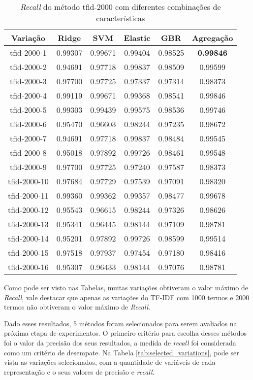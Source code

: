 \begin{table}[H]
\centering
\begin{tabular}{|c| c c  c  c  c| }
\hline
Variação &  Ridge & SVM & Elastic & GBR & Agregação  \\ 
\hline
tfid-2000-1 & 0.99307 & 0.99671 & 0.99404 & 0.98525 & \textbf{0.99846} \\
\hline
tfid-2000-2 & 0.94691 & 0.97718 & 0.99837 & 0.98509 & 0.99599 \\
\hline
tfid-2000-3 & 0.97700 & 0.97725 & 0.97337 & 0.97314 & 0.98373 \\
\hline
tfid-2000-4 & 0.99119 & 0.99671 & 0.99368 & 0.98541 & 0.99846 \\
\hline
tfid-2000-5 & 0.99303 & 0.99439 & 0.99575 & 0.98536 & 0.99746 \\
\hline
tfid-2000-6 & 0.95470 & 0.96603 & 0.98244 & 0.97235 & 0.98672 \\
\hline
tfid-2000-7 & 0.94691 & 0.97718 & 0.99837 & 0.98484 & 0.99545 \\
\hline
tfid-2000-8 & 0.95018 & 0.97892 & 0.99726 & 0.98461 & 0.99548 \\
\hline
tfid-2000-9 & 0.97700 & 0.97725 & 0.97240 & 0.97587 & 0.98373 \\
\hline
tfid-2000-10 & 0.97684 & 0.97729 & 0.97539 & 0.97091 & 0.98320 \\
\hline
tfid-2000-11 & 0.99360 & 0.99362 & 0.99357 & 0.98477 & 0.99678 \\
\hline
tfid-2000-12 & 0.95543 & 0.96615 & 0.98244 & 0.97326 & 0.98626 \\
\hline
tfid-2000-13 & 0.95341 & 0.96445 & 0.98144 & 0.97109 & 0.98781 \\
\hline
tfid-2000-14 & 0.95201 & 0.97892 & 0.99726 & 0.98599 & 0.99514 \\
\hline
tfid-2000-15 & 0.97518 & 0.97937 & 0.97454 & 0.97180 & 0.98416 \\
\hline
tfid-2000-16 & 0.95307 & 0.96433 & 0.98144 & 0.97076 & 0.98781 \\
\hline
\end{tabular}
\caption{\textit{Recall} do método tfid-2000 com diferentes combinações de características}
\label{tab:recalltfid2000}
\end{table}
Como pode ser visto nas Tabelas, muitas variações obtiveram o valor máximo de \textit{Recall}, vale destacar que apenas as variações do TF-IDF com 1000 termos e 2000 termos não obtiveram o valor máximo de \textit{Recall}.

Dado esses resultados, 5 métodos foram selecionados para serem avaliados na próxima etapa de experimentos. O primeiro critério para escolha desses métodos foi o valor da precisão dos seus resultados, a medida de \textit{recall} foi considerada como um critério de desempate. Na Tabela \ref{tab:selected_variations}, pode ser vista as variações selecionados, com a quantidade de variáveis de cada representação e o seus valores de precisão e \textit{recall}.

